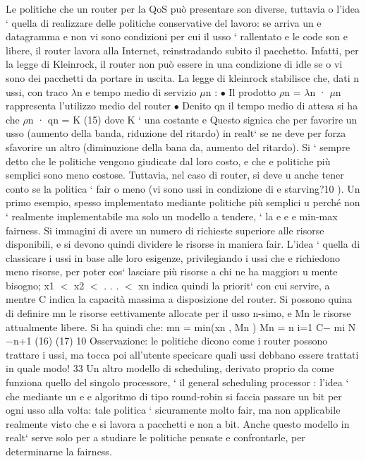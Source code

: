 \documentclass[a4paper,12pt]{article}
\begin{document}
Le politiche che un router per la QoS può presentare son diverse, tuttavia
o
l'idea ` quella di realizzare delle politiche conservative del lavoro: se arriva un
e
datagramma e non vi sono condizioni per cui il usso ` rallentato e le code son
e
libere, il router lavora alla Internet, reinstradando subito il pacchetto. Infatti,
per la legge di Kleinrock, il router non può essere in una condizione di idle se
o
vi sono dei pacchetti da portare in uscita. La legge di kleinrock stabilisce che,
dati n ussi, con traco $\lambda$n e tempo medio di servizio $\mu$n :
$\bullet$ Il prodotto $\rho$n = $\lambda$n · $\mu$n rappresenta l'utilizzo medio del router
$\bullet$ Denito qn il tempo medio di attesa si ha che
$\rho$n · qn = K
(15)
dove K ` una costante
e
Questo signica che per favorire un usso (aumento della banda, riduzione del
ritardo) in realt` se ne deve per forza sfavorire un altro (diminuzione della bana
da, aumento del ritardo).
Si ` sempre detto che le politiche vengono giudicate dal loro costo, e che
e
politiche più semplici sono meno costose. Tuttavia, nel caso di router, si deve
u
anche tener conto se la politica ` fair o meno (vi sono ussi in condizione di
e
starving?10 ).
Un primo esempio, spesso implementato mediante politiche più semplici
u
perché non ` realmente implementabile ma solo un modello a tendere, ` la
e
e
e
min-max fairness. Si immagini di avere un numero di richieste superiore alle
risorse disponibili, e si devono quindi dividere le risorse in maniera fair. L'idea
` quella di classicare i ussi in base alle loro esigenze, privilegiando i ussi che
e
richiedono meno risorse, per poter cos` lasciare più risorse a chi ne ha maggior\i{}
u
mente bisogno; x1 $<$ x2 $<$ . . . $<$ xn indica quindi la priorit` con cui servire,
a
mentre C indica la capacità massima a disposizione del router. Si possono quina
di definire mn le risorse eettivamente allocate per il usso n-simo, e Mn le
risorse attualmente libere. Si ha quindi che:
mn = min(xn , Mn )
Mn =
n
i=1
C$-$
mi
N $-$n+1
(16)
(17)
10 Osservazione: le politiche dicono come i router possono trattare i ussi, ma tocca poi
all'utente specicare quali ussi debbano essere trattati in quale modo!
33
Un altro modello di scheduling, derivato proprio da come funziona quello del
singolo processore, ` il general scheduling processor : l'idea ` che mediante un
e
e
algoritmo di tipo round-robin si faccia passare un bit per ogni usso alla volta:
tale politica ` sicuramente molto fair, ma non applicabile realmente visto che
e
si lavora a pacchetti e non a bit. Anche questo modello in realt` serve solo per
a
studiare le politiche pensate e confrontarle, per determinarne la fairness.
\end{document}
